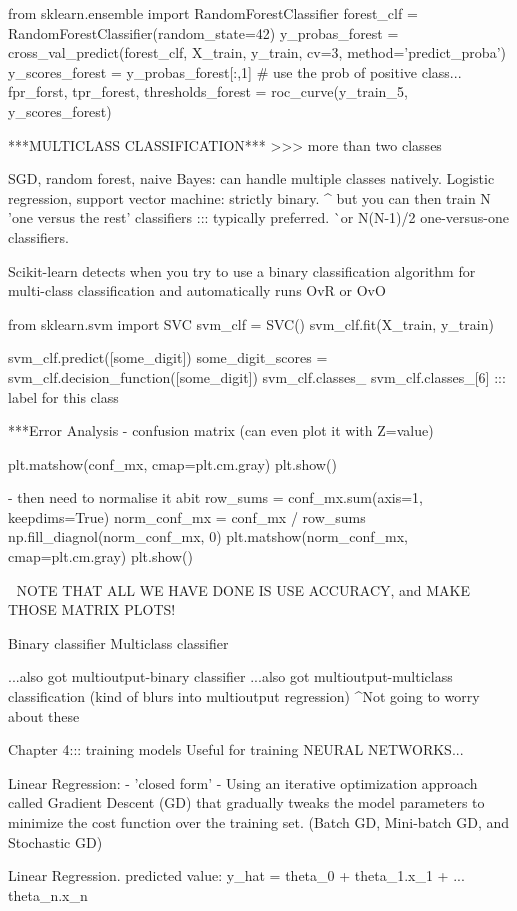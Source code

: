 from sklearn.ensemble import RandomForestClassifier
forest_clf = RandomForestClassifier(random_state=42)
y_probas_forest = cross_val_predict(forest_clf, X_train, y_train, cv=3, method='predict_proba')
y_scores_forest = y_probas_forest[:,1] # use the prob of positive class...
fpr_forst, tpr_forest, thresholds_forest = roc_curve(y_train_5, y_scores_forest)


***MULTICLASS CLASSIFICATION***
>>> more than two classes

SGD, random forest, naive Bayes: can handle multiple classes natively.
Logistic regression, support vector machine: strictly binary.
^ but you can then train N 'one versus the rest' classifiers ::: typically preferred.
^^ or N(N-1)/2 one-versus-one classifiers. 

Scikit-learn detects when you try to use a binary classification algorithm for multi-class classification
and automatically runs OvR or OvO

from sklearn.svm import SVC
svm_clf = SVC()
svm_clf.fit(X_train, y_train)

svm_clf.predict([some_digit])
some_digit_scores = svm_clf.decision_function([some_digit])
svm_clf.classes_
svm_clf.classes_[6] ::: label for this class

***Error Analysis
- confusion matrix (can even plot it with Z=value)

plt.matshow(conf_mx, cmap=plt.cm.gray)
plt.show()

- then need to normalise it abit
row_sums = conf_mx.sum(axis=1, keepdims=True)
norm_conf_mx = conf_mx / row_sums
np.fill_diagnol(norm_conf_mx, 0)
plt.matshow(norm_conf_mx, cmap=plt.cm.gray)
plt.show()

^^^
NOTE THAT ALL WE HAVE DONE IS USE ACCURACY, and MAKE THOSE MATRIX PLOTS!

Binary classifier
Multiclass classifier

...also got multioutput-binary classifier
...also got multioutput-multiclass classification (kind of blurs into multioutput regression)
^Not going to worry about these


Chapter 4::: training models
Useful for training NEURAL NETWORKS...

Linear Regression:
- 'closed form'
-
Using an iterative optimization approach called Gradient Descent (GD)
that gradually tweaks the model parameters to minimize the cost function over the training set.
(Batch GD, Mini-batch GD, and Stochastic GD)

Linear Regression.
predicted value: y_hat = theta_0 + theta_1.x_1 + ... theta_n.x_n

